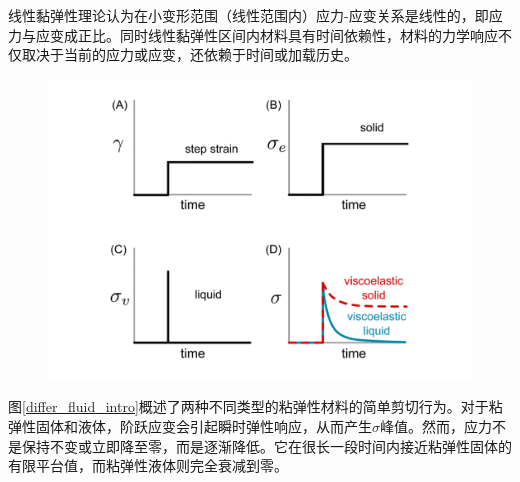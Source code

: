 线性黏弹性理论认为在小变形范围（线性范围内）应力-应变关系是线性的，即应力与应变成正比。同时线性黏弹性区间内材料具有时间依赖性，材料的力学响应不仅取决于当前的应力或应变，还依赖于时间或加载历史。
\begin{figure}[htbp]
  \centering
  \includegraphics[width=\textwidth]{Fig/solid_liquid.pdf}
\end{figure}
图\ref{differ_fluid_intro}概述了两种不同类型的粘弹性材料的简单剪切行为。对于粘弹性固体和液体，阶跃应变会引起瞬时弹性响应，从而产生$\sigma$峰值。然而，应力不是保持不变或立即降至零，而是逐渐降低。它在很长一段时间内接近粘弹性固体的有限平台值，而粘弹性液体则完全衰减到零\cite{ricarteTutorialReviewLinear2024}。

